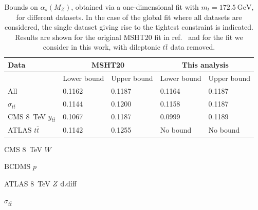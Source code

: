 \documentclass[sn-mathphys]{sn-jnl}%
\newcommand{\ytt}{y_{t\bar{t}}}
\newcommand{\mt}{m_t}
\newcommand{\ttbar}{t\bar{t}}
\newcommand{\as}{\alpha_s(M_Z)}
\newcommand{\gev}{\mathrm{GeV}}
\begin{document}
\begin{appendices}
\begin{table}[hb!]
\begin{center}
\renewcommand\arraystretch{1.25}
\begin{threeparttable}
\begin{tabular}{|l|l|l|l|l|}
\hline
Data   & \multicolumn{2}{c|}{MSHT20}  &   \multicolumn{2}{c|}{This analysis}  \\
\hline
& Lower bound & Upper bound & Lower bound & Upper bound \\ 
\hline
All   &  0.1162 \tnote{$\ast$} & 0.1187 \tnote{$\dagger$} & 0.1164 \tnote{$\ddagger$} & 0.1187 \tnote{$\mathsection$}\\ 
$\sigma_{\ttbar}$   &  0.1144  & 0.1200  & 0.1158 & 0.1187 \\
CMS 8~TeV $\ytt$ &  0.1067  & 0.1187  & 0.0999 & 0.1189 \\
ATLAS $\ttbar$ &  0.1142  & 0.1255  & No bound & No bound \\
\hline
\end{tabular}
\begin{tablenotes}\footnotesize
\item[$\ast$] CMS 8~TeV $W$~\cite{CMS:2016qqr}\hspace{-1em}
\item[$\dagger$] BCDMS $p$~\cite{BCDMS}\hspace{-1em}
\item[$\ddagger$] ATLAS 8~TeV $Z~\rm{d. diff}$~\cite{ATLAS:2017rue}\hspace{-1em}
\item[$\mathsection$] $\sigma_{\ttbar}$~\cite{ATLAS:2010zaw,ATLAS:2011whm,ATLAS:2012ptu,ATLAS:2012aa,ATLAS:2012xru,ATLAS:2012qtn,ATLAS:2015xtk,CMS:2012ahl,CMS:2012exf,CMS:2012hcu,CMS:2013nie,CMS:2013yjt,CMS:2013hon,CMS:2014btv,CMS:2015auz,CDF:2013hmv}
\end{tablenotes}
\end{threeparttable}
\end{center}
\caption{Bounds on $\as$, obtained via a one-dimensional fit with $\mt=172.5~\gev$, for different datasets. In the case of the global fit where all datasets are considered, the single dataset giving rise to the tightest constraint is indicated. 
Results are shown for the original MSHT20 fit in ref.~\cite{Bailey:2020ooq} and for the fit we consider in this work, with dileptonic $\ttbar$ data removed.
}
\label{asboundsmt1725}   
\end{table}

\end{appendices}
\newpage

\end{document}
